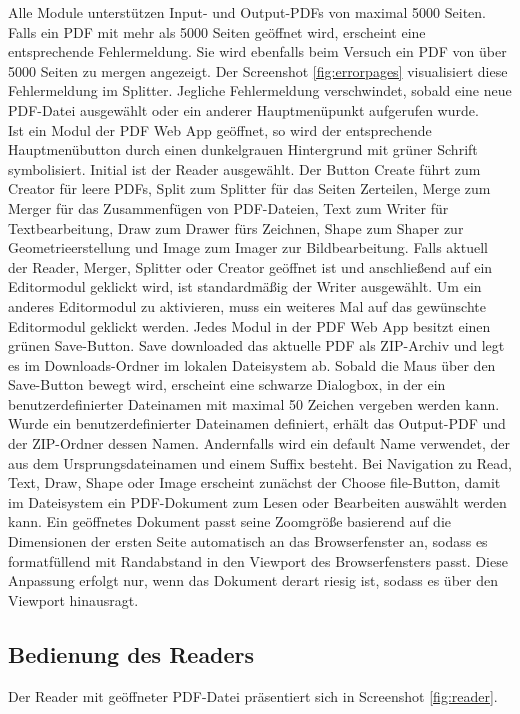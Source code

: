 Alle Module unterstützen Input- und Output-PDFs von maximal 5000 Seiten. Falls ein PDF mit mehr als 5000 Seiten geöffnet wird, erscheint eine entsprechende Fehlermeldung. Sie wird ebenfalls beim Versuch ein PDF von über 5000 Seiten zu mergen angezeigt. Der Screenshot \ref{fig:errorpages} visualisiert diese Fehlermeldung im Splitter. Jegliche Fehlermeldung verschwindet, sobald eine neue PDF-Datei ausgewählt oder ein anderer Hauptmenüpunkt aufgerufen wurde. \\
Ist ein Modul der PDF Web App geöffnet, so wird der entsprechende Hauptmenübutton durch einen dunkelgrauen Hintergrund mit grüner Schrift symbolisiert. Initial ist der Reader ausgewählt. Der Button Create führt zum Creator für leere PDFs, Split zum Splitter für das Seiten Zerteilen, Merge zum Merger für das Zusammenfügen von PDF-Dateien, Text zum Writer für Textbearbeitung, Draw zum Drawer fürs Zeichnen, Shape zum Shaper zur Geometrieerstellung und Image zum Imager zur Bildbearbeitung. Falls aktuell der Reader, Merger, Splitter oder Creator geöffnet ist und anschließend auf ein Editormodul geklickt wird, ist standardmäßig der Writer ausgewählt. Um ein anderes Editormodul zu aktivieren, muss ein weiteres Mal auf das gewünschte Editormodul geklickt werden. Jedes Modul in der PDF Web App besitzt einen grünen Save-Button. Save downloaded das aktuelle PDF als ZIP-Archiv und legt es im Downloads-Ordner im lokalen Dateisystem ab. Sobald die Maus über den Save-Button bewegt wird, erscheint eine schwarze Dialogbox, in der ein benutzerdefinierter Dateinamen mit maximal 50 Zeichen vergeben werden kann. Wurde ein benutzerdefinierter Dateinamen definiert, erhält das Output-PDF und der ZIP-Ordner dessen Namen. Andernfalls wird ein default Name verwendet, der aus dem Ursprungsdateinamen und einem Suffix besteht. Bei Navigation zu Read, Text, Draw, Shape oder Image erscheint zunächst der Choose file-Button, damit im Dateisystem ein PDF-Dokument zum Lesen oder Bearbeiten auswählt werden kann. Ein geöffnetes Dokument passt seine Zoomgröße basierend auf die Dimensionen der ersten Seite automatisch an das Browserfenster an, sodass es formatfüllend mit Randabstand in den Viewport des Browserfensters passt. Diese Anpassung erfolgt nur, wenn das Dokument derart riesig ist, sodass es über den Viewport hinausragt.

\subsection{Bedienung des Readers}
Der Reader mit geöffneter PDF-Datei präsentiert sich in Screenshot \ref{fig:reader}.


